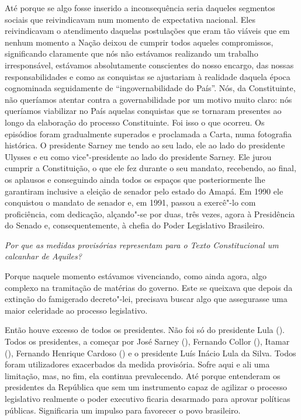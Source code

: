 Até porque se algo fosse inserido a inconsequência seria daqueles
segmentos sociais que reivindicavam num momento de expectativa nacional.
Eles reivindicavam o atendimento daquelas postulações que eram tão
viáveis que em nenhum momento a Nação deixou de cumprir todos aqueles
compromissos, significando claramente que nós não estávamos realizando
um trabalho irresponsável, estávamos absolutamente conscientes do nosso
encargo, das nossas responsabilidades e como as conquistas se ajustariam
à realidade daquela época cognominada seguidamente de
``ingovernabilidade do País''. Nós, da Constituinte, não queríamos
atentar contra a governabilidade por um motivo muito claro: nós
queríamos viabilizar no País aquelas conquistas que se tornaram
presentes ao longo da elaboração do processo Constituinte. Foi isso o
que ocorreu. Os episódios foram gradualmente superados e proclamada a
Carta, numa fotografia histórica. O presidente Sarney me tendo ao seu
lado, ele ao lado do presidente Ulysses e eu como vice"-presidente ao
lado do presidente Sarney. Ele jurou cumprir a Constituição, o que ele
fez durante o seu mandato, recebendo, ao final, os aplausos e
conseguindo ainda todos os espaços que posteriormente lhe garantiram
inclusive a eleição de senador pelo estado do Amapá. Em 1990 ele
conquistou o mandato de senador e, em 1991, passou a exercê"-lo com
proficiência, com dedicação, alçando"-se por duas, três vezes, agora à
Presidência do Senado e, consequentemente, à chefia do Poder Legislativo
Brasileiro.

\medskip

\emph{Por que as medidas provisórias representam para o Texto
Constitucional um calcanhar de Aquiles?}

Porque naquele momento estávamos vivenciando, como
ainda agora, algo complexo na tramitação de matérias do governo. Este se
queixava que depois da extinção do famigerado decreto"-lei, precisava
buscar algo que assegurasse uma maior celeridade ao processo
legislativo.

Então houve excesso de todos os presidentes. Não foi só do presidente
Lula (). Todos os presidentes, a começar por José Sarney (),
Fernando Collor (), Itamar (), Fernando Henrique Cardoso () e
o presidente Luís Inácio Lula da Silva. Todos foram utilizadores
exacerbados da medida provisória. Sofre aqui e ali uma limitação, mas,
no fim, ela continua prevalecendo. Até porque entenderam os presidentes
da República que sem um instrumento capaz de agilizar o processo
legislativo realmente o poder executivo ficaria desarmado para aprovar
políticas públicas. Significaria um impulso para favorecer o povo
brasileiro.

